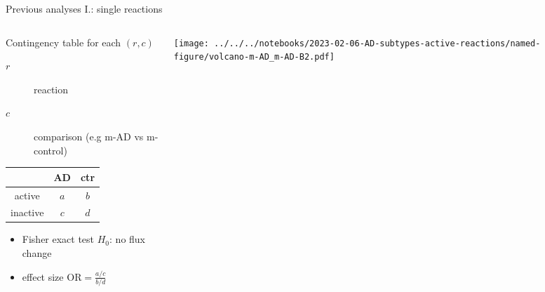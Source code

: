 \documentclass[aspectratio=169]{beamer}
\begin{document}
\begin{frame}{Previous analyses I.: single reactions}
\begin{columns}[t]
\begin{column}{0.5\textwidth}
Contingency table for each $(r,c)$
  \begin{description}
    \item[$r$] reaction
    \item[$c$] comparison (e.g m-AD vs m-control)
  \end{description}

\begin{center}
\begin{tabular}{c|cc|}
& AD & ctr \\
\hline
active & $a$ & $b$ \\
inactive & $c$ & $d$ \\
\hline
\end{tabular}
\end{center}

\begin{itemize}
  \item Fisher exact test $H_0$: no flux change
  \item effect size
$
  \mathrm{OR} = \frac{a/c}{b/d}
$
\end{itemize}
\end{column}

\begin{column}{0.5\textwidth}

\texttt{[image: ../../../notebooks/2023-02-06-AD-subtypes-active-reactions/named-figure/volcano-m-AD\_m-AD-B2.pdf]}
\end{column}
\end{columns}
\end{frame}
\end{document}
